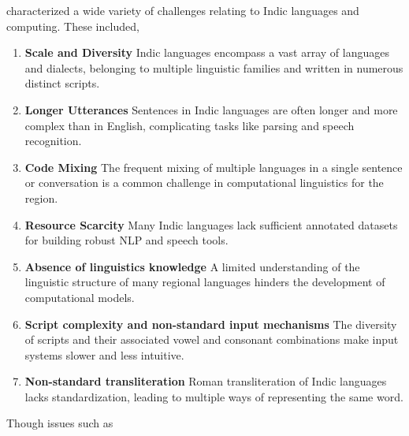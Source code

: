 \citet{bhattacharyya2019indic} characterized a wide variety of challenges relating
to Indic languages and computing. These included, 
\begin{enumerate} 
  \item \textbf{Scale and Diversity}
  Indic languages encompass a vast array of languages and dialects, belonging to multiple linguistic families and written in numerous distinct scripts.
  \item \textbf{Longer Utterances}
    Sentences in Indic languages are often longer and more complex than in English, complicating tasks like parsing and speech recognition.
  \item \textbf{Code Mixing}
    The frequent mixing of multiple languages in a single sentence or conversation is a common challenge in computational linguistics for the region.
  \item \textbf{Resource Scarcity}
    Many Indic languages lack sufficient annotated datasets for building robust NLP and speech tools.
  \item \textbf{Absence of linguistics knowledge}
    A limited understanding of the linguistic structure of many regional languages hinders the development of computational models.
  \item \textbf{Script complexity and non-standard input mechanisms}
    The diversity of scripts and their associated vowel and consonant combinations make input systems slower and less intuitive.
  \item \textbf{Non-standard transliteration}
    Roman transliteration of Indic languages lacks standardization, leading to multiple ways of representing the same word.
\end{enumerate}
Though issues such as \textit{}

